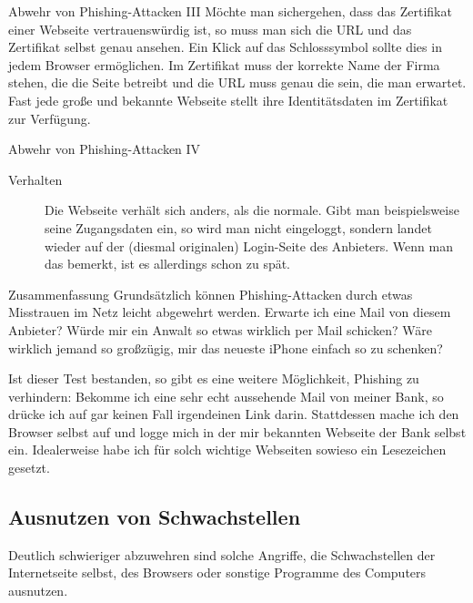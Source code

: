\documentclass[utf8]{beamer}
\begin{document}
	\begin{frame}{Abwehr von Phishing-Attacken III}
		Möchte man sichergehen, dass das Zertifikat einer Webseite vertrauenswürdig ist, so muss man sich die URL und das Zertifikat selbst genau ansehen. Ein Klick auf das Schlosssymbol sollte dies in jedem Browser ermöglichen.
		Im Zertifikat muss der korrekte Name der Firma stehen, die die Seite betreibt und die URL muss genau die sein, die man erwartet. Fast jede große und bekannte Webseite stellt ihre Identitätsdaten im Zertifikat zur Verfügung.
	\end{frame}
	
	\begin{frame}{Abwehr von Phishing-Attacken IV}
		\begin{description}
			\item[Verhalten] {Die Webseite verhält sich anders, als die normale. Gibt man beispielsweise seine Zugangsdaten ein, so wird man nicht eingeloggt, sondern landet wieder auf der (diesmal originalen) Login-Seite des Anbieters. Wenn man das bemerkt, ist es allerdings schon zu spät.}
		\end{description}
	\end{frame}
	
	\begin{frame}{Zusammenfassung}
		Grundsätzlich können Phishing-Attacken durch etwas Misstrauen im Netz leicht abgewehrt werden. Erwarte ich eine Mail von diesem Anbieter? Würde mir ein Anwalt so etwas wirklich per Mail schicken? Wäre wirklich jemand so großzügig, mir das neueste iPhone einfach so zu schenken?
		
		Ist dieser Test bestanden, so gibt es eine weitere Möglichkeit, Phishing zu verhindern: Bekomme ich eine sehr echt aussehende Mail von meiner Bank, so drücke ich auf gar keinen Fall irgendeinen Link darin. Stattdessen mache ich den Browser selbst auf und logge mich in der mir bekannten Webseite der Bank selbst ein. Idealerweise habe ich für solch wichtige Webseiten sowieso ein Lesezeichen gesetzt.
	\end{frame}
	
	\subsection{Ausnutzen von Schwachstellen}
	\begin{frame}
		Deutlich schwieriger abzuwehren sind solche Angriffe, die Schwachstellen der Internetseite selbst, des Browsers oder sonstige Programme des Computers ausnutzen.
	\end{frame}
	
\end{document}
